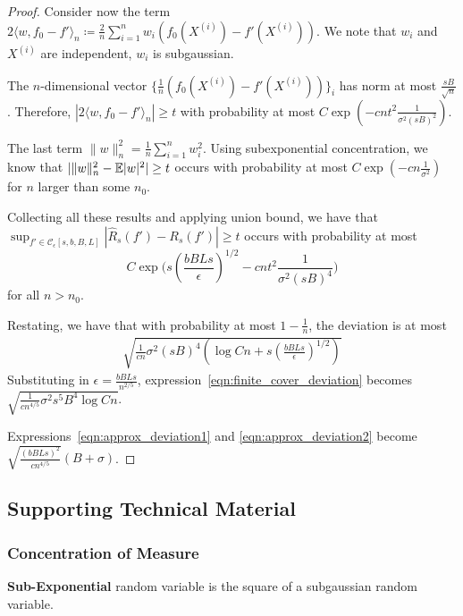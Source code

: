 \begin{proof}
Consider now the term $2 \langle w, f_0 - f' \rangle_n \coloneqq \frac{2}{n} \sum_{i=1}^n w_i ( f_0(X^{(i)}) - f'(X^{(i)}))$. We note that $w_i$ and $X^{(i)}$ are independent, $w_i$ is subgaussian. 

The $n$-dimensional vector $\{ \frac{1}{n} ( f_0(X^{(i)}) - f'(X^{(i)})) \}_i$ has norm at most $\frac{sB}{\sqrt{n}}$. Therefore, $|2 \langle w, f_0 - f' \rangle_n | \geq t$ with probability at most $C \exp( - c n t^2 \frac{1}{\sigma^2(sB)^2})$. 

The last term $\| w \|_n^2 = \frac{1}{n} \sum_{i=1}^n w_i^2$. Using subexponential concentration, we know that $ |\| w \|_n^2 - {\mathbb E}|w|^2 | \geq t$ occurs with probability at most $C \exp( - c n \frac{1}{\sigma^2} )$ for $n$ larger than some $n_0$.

Collecting all these results and applying union bound, we have that $\sup_{f' \in \mathcal{C}_\epsilon[s,b,B,L]} | \hat{R}_s(f') - R_s(f') | \geq t$ occurs with probability at most
\[
C \exp\big( s\left( \frac{bBLs}{\epsilon} \right)^{1/2} - c n t^2 \frac{1}{\sigma^2 (sB)^4} \big)
\]
for all $n > n_0$.

Restating, we have that with probability at most $1- \frac{1}{n}$, the deviation is at most 
\begin{align}
\sqrt{ \frac{1}{cn} \sigma^2 (sB)^4 \left( \log Cn + s( \frac{bBLs}{\epsilon})^{1/2} \right)} \label{eqn:finite_cover_deviation}
\end{align}
Substituting in $\epsilon = \frac{bBLs}{n^{2/5}}$, expression~\ref{eqn:finite_cover_deviation} becomes $\sqrt{ \frac{1}{cn^{4/5}} \sigma^2 s^5 B^4 \log Cn}$.

Expressions~\ref{eqn:approx_deviation1} and \ref{eqn:approx_deviation2} become $\sqrt{ \frac{(bBLs)^2}{cn^{4/5}}} (B+\sigma)$.

\end{proof}
 
 
 
 
 
 
 
 \subsection{Supporting Technical Material}
 
 \subsubsection{Concentration of Measure}

\textbf{Sub-Exponential} random variable is the square of a subgaussian random variable\cite{vershynin2010introduction}.


